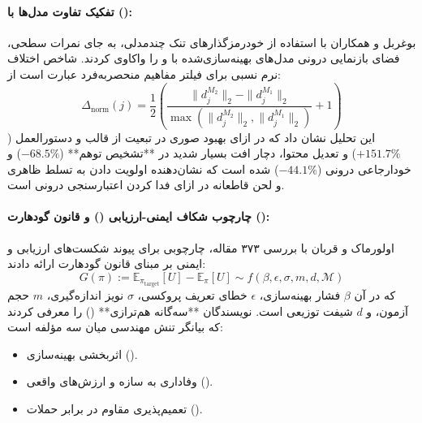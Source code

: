 \paragraph*{تفکیک تفاوت مدل‌ها با  ():}
بوغربل و همکاران \cite{boughorbel2025beyond} با استفاده از خودرمزگذارهای تنک چندمدلی، به جای نمرات سطحی، فضای بازنمایی درونی مدل‌های بهینه‌سازی‌شده با  و  را واکاوی کردند. شاخص اختلاف نرم نسبی برای فیلتر مفاهیم منحصر‌به‌فرد عبارت است از:
\begin{equation}
    \Delta_{\text{norm}}(j) = \frac{1}{2} \left( \frac{\|d_j^{M_2}\|_2 - \|d_j^{M_1}\|_2}{\max(\|d_j^{M_2}\|_2, \|d_j^{M_1}\|_2)} + 1 \right)
\end{equation}
این تحلیل نشان داد که  در ازای بهبود صوری در تبعیت از قالب و دستورالعمل ($+151.7\%$) و تعدیل محتوا، دچار افت بسیار شدید در **تشخیص توهم** ($-68.5\%$) و خودارجاعی درونی ($-44.1\%$) شده است که نشان‌دهنده اولویت دادن به تسلط ظاهری و لحن قاطعانه در ازای فدا کردن اعتبارسنجی درونی است.

\paragraph*{چارچوب شکاف ایمنی-ارزیابی () و قانون گودهارت ():}
اولورماک و قربان با بررسی ۳۷۳ مقاله، چارچوبی برای پیوند شکست‌های ارزیابی و ایمنی بر مبنای قانون گودهارت ارائه دادند:
\begin{equation}
    G(\pi) := \mathbb{E}_{\pi_{\text{target}}}[U] - \mathbb{E}_\pi[U] \sim f(\beta, \epsilon, \sigma, m, d, \mathcal{M})
\end{equation}
که در آن $\beta$ فشار بهینه‌سازی، $\epsilon$ خطای تعریف پروکسی، $\sigma$ نویز اندازه‌گیری، $m$ حجم آزمون، و $d$ شیفت توزیعی است. 
نویسندگان **سه‌گانه هم‌ترازی** () را معرفی کردند که بیانگر تنش مهندسی میان سه مؤلفه است:
\begin{itemize}
    \item اثربخشی بهینه‌سازی ().
    \item وفاداری به سازه و ارزش‌های واقعی ().
    \item تعمیم‌پذیری مقاوم در برابر حملات ().
\end{itemize}

